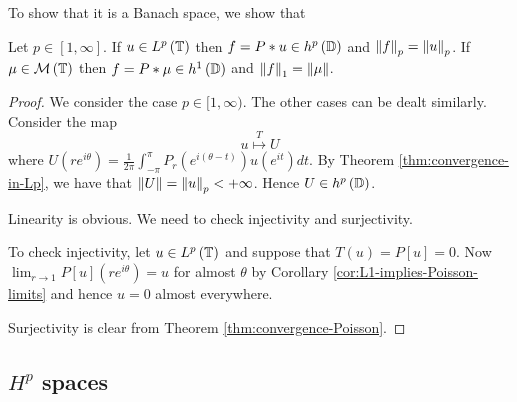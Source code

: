 To show that it is a Banach space, we show that

\begin{theorem}
    Let $p\in [1, \infty]$. If $u\in L^{p} \left( \mathbb T \right)$ then $f=P * u \in h^{p} \left( \mathbb D \right)$ and $\left\lVert f \right\rVert_{p} =\left\lVert u \right\rVert_{p}$. If $\mu \in {\cal M} \left( \mathbb T \right)$ then $f= P * \mu \in h^{1} \left( \mathbb D \right)$ and $\left\lVert f \right\rVert_{1} = \left\lVert \mu \right\rVert$.
    \label{thm:lp-and-hp}
\end{theorem}
\begin{proof}
    We consider the case $p \in [1, \infty )$. The other cases can be dealt similarly. Consider the map 
    \begin{equation*}
	u \stackrel{T}{\mapsto} U
    \end{equation*}
    where $U\left( re^{i\theta} \right) = \frac{1}{2\pi} \int_{-\pi}^{\pi} P_{r}\left( e^{i(\theta-t)} \right) u \left( e^{it} \right) dt$. By Theorem \ref{thm:convergence-in-Lp}, we have that $\left\lVert U \right\rVert = \left\lVert u \right\rVert_{p} < +\infty$. Hence $U \in h^{p} \left( \mathbb D \right)$.

    Linearity is obvious. We need to check injectivity and surjectivity.

    To check injectivity, let $u \in L^{p} \left( \mathbb T \right)$ and suppose that $T(u)=P[u]=0$. Now $\lim_{r\to 1} P[u] \left( re^{i\theta} \right) = u$ for almost $\theta$ by Corollary \ref{cor:L1-implies-Poisson-limits} and hence $u=0$ almost everywhere.

    Surjectivity is clear from Theorem \ref{thm:convergence-Poisson}.
    \end{proof}


\subsection{\texorpdfstring{$H^p$}{} spaces}
